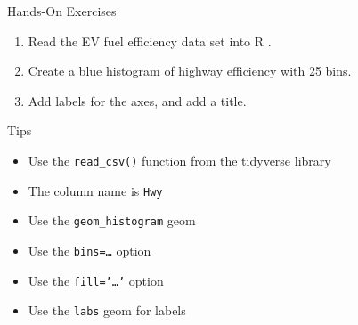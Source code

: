 \documentclass[ignorenonframetext,xcolor=x11names]{beamer}
\begin{document}

\begin{frame}{Hands-On Exercises}
\begin{block}{}
\begin{enumerate}
    \item Read the EV fuel efficiency data set into R .
    \item Create a blue histogram of highway efficiency with 25 bins.
    \item Add labels for the axes, and add a title.
\end{enumerate}
\end{block}

\begin{block}{Tips}
    \begin{itemize} 
       \item Use the \texttt{read\_csv()} function from the tidyverse library
       \item The column name is \texttt{Hwy}
       \item Use the \texttt{geom\_histogram} geom
       \item Use the \texttt{bins=\ldots} option
       \item Use the \texttt{fill='\ldots'} option
       \item Use the \texttt{labs} geom for labels
    \end{itemize}
\end{block}
\end{frame}
\end{document}
